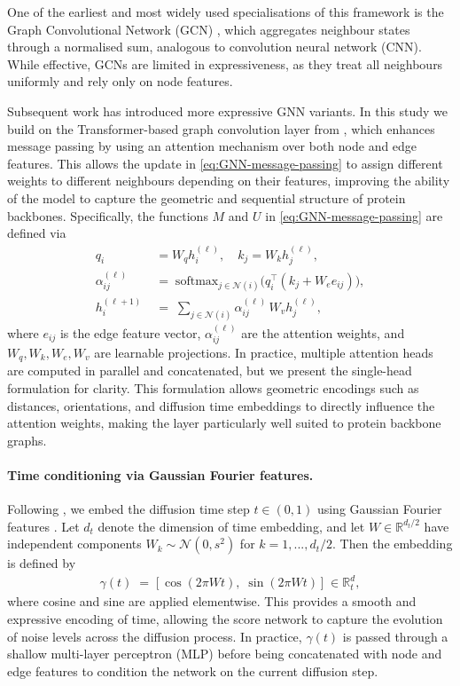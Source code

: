 \documentclass[a4paper,12pt]{article}
\begin{document}
One of the earliest and most widely used specialisations of this framework is the Graph Convolutional Network (GCN) \citep{kipf2017SemiSupervisedClassificationGraph}, which aggregates neighbour states through a normalised sum, analogous to convolution neural network (CNN). While effective, GCNs are limited in expressiveness, as they treat all neighbours uniformly and rely only on node features.

Subsequent work has introduced more expressive GNN variants. In this study we build on the Transformer-based graph convolution layer from \citet{shi2021MaskedLabelPrediction}, which enhances message passing by using an attention mechanism over both node and edge features. This allows the update in \cref{eq:GNN-message-passing} to assign different weights to different neighbours depending on their features, improving the ability of the model to capture the geometric and sequential structure of protein backbones. Specifically, the functions \(M\) and \(U\) in \cref{eq:GNN-message-passing} are defined via
\begin{align*}
    q_i \;&= W_q h_i^{(\ell)},\quad k_j = W_k h_j^{(\ell)}, \\
    \alpha_{ij}^{(\ell)} \;&=\; \mathrm{softmax}_{j \in \mathcal{N}(i)} 
    \big( q_i^{\top} (k_j + W_e e_{ij}) \big), \\
    h_i^{(\ell+1)} \;&=\; \sum_{j \in \mathcal{N}(i)} 
    \alpha_{ij}^{(\ell)} \, W_v h_j^{(\ell)},
\end{align*}
where \(e_{ij}\) is the edge feature vector, \(\alpha_{ij}^{(\ell)}\) are the attention weights, and \(W_q, W_k, W_e, W_v\) are learnable projections. In practice, multiple attention heads are computed in parallel and concatenated, but we present the single-head formulation for clarity. This formulation allows geometric encodings such as distances, orientations, and diffusion time embeddings to directly influence the attention weights, making the layer particularly well suited to protein backbone graphs.

\paragraph{Time conditioning via Gaussian Fourier features.}
Following \citet{song2021ScoreBasedGenerativeModeling}, we embed the diffusion time step \(t \in (0,1)\) using Gaussian Fourier features \citep{tancikFourierFeaturesLet2020}. Let \(d_{t}\) denote the dimension of time embedding, and let \(W \in \mathbb{R}^{d_{t}/2}\) have independent components \(W_k \sim \mathcal{N}(0,s^2)\) for \(k=1,...,d_{t}/2\). Then the embedding is defined by
\begin{align}\label{eq:time-embedding}
    \gamma(t) \;=\; \big[\, \cos(2\pi W t),\; \sin(2\pi W t)\,\big] \;\in \mathbb{R}^d_t,
\end{align}
where cosine and sine are applied elementwise. This provides a smooth and expressive encoding of time, allowing the score network to capture the evolution of noise levels across the diffusion process. In practice, \(\gamma(t)\) is passed through a shallow multi-layer perceptron (MLP) before being concatenated with node and edge features to condition the network on the current diffusion step.
\end{document}

